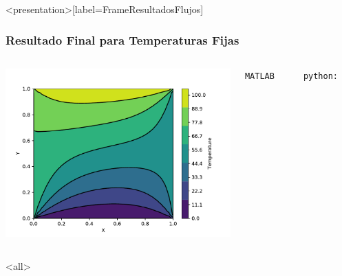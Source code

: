 \begin{frame}<presentation>[label=FrameResultadosFlujos]

  \frametitle{Resultado Final para Temperaturas Fijas}
  \begin{columns}
    
    \includegraphics[width=1.1\textwidth, page=2]{./DATA/Temperaturas-Flujos-1.pdf}

      \texttt{MATLAB}
    \begin{codeblock}
      
    \end{codeblock}
      
      \vspace{1cm}
      \texttt{python:}
    \begin{codeblock}
      
    \end{codeblock}
  \end{columns}


\end{frame}
\mode<all>
